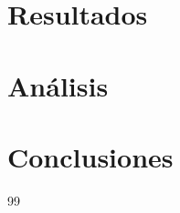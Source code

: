 \documentclass{article}
\begin{document}
\section{Resultados}
\section{An\'alisis}
\section{Conclusiones}
\begin{thebibliography}{99}

\end{thebibliography}
\end{document}

